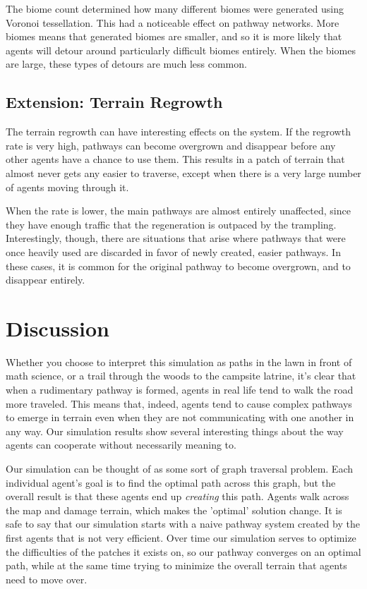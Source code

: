 \documentclass[conference]{IEEEtran}
\begin{document}
The biome count determined how many different biomes were generated using Voronoi tessellation. This had a noticeable effect on pathway networks. More biomes means that generated biomes are smaller, and so it is more likely that agents will detour around particularly difficult biomes entirely. When the biomes are large, these types of detours are much less common.

\subsection{Extension: Terrain Regrowth}
The terrain regrowth can have interesting effects on the system. If the regrowth rate is very high, pathways can become overgrown and disappear before any other agents have a chance to use them. This results in a patch of terrain that almost never gets any easier to traverse, except when there is a very large number of agents moving through it.

When the rate is lower, the main pathways are almost entirely unaffected, since they have enough traffic that the regeneration is outpaced by the trampling. Interestingly, though, there are situations that arise where pathways that were once heavily used are discarded in favor of newly created, easier pathways. In these cases, it is common for the original pathway to become overgrown, and to disappear entirely.

\section{Discussion} 
	Whether you choose to interpret this simulation as paths in the lawn in front of math science, or a trail through the woods to the campsite latrine, it's clear that when a rudimentary pathway is formed, agents in real life tend to walk the road more traveled. This means that, indeed, agents tend to cause complex pathways to emerge in terrain even when they are not communicating with one another in any way.	Our simulation results show several interesting things about the way agents can cooperate without necessarily meaning to. 
	
	Our simulation can be thought of as some sort of graph traversal problem. Each individual agent's goal is to find the optimal path across this graph, but the overall result is that these agents end up \textit{creating} this path. Agents walk across the map and damage terrain, which makes the 'optimal' solution change. It is safe to say that our simulation starts with a naive pathway system created by the first agents that is not very efficient. Over time our simulation serves to optimize the difficulties of the patches it exists on, so our pathway converges on an optimal path, while at the same time trying to minimize the overall terrain that agents need to move over.
	
\end{document}
